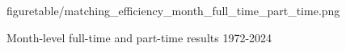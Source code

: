 \documentclass[12pt]{article}
\begin{document}
\begin{figure}[!ht]
\begin{center}
{  {figuretable/matching_efficiency_month_full_time_part_time.png}}
  \caption{Month-level full-time and part-time results 1972-2024}
  \label{fg:month_full_time_part_time_results} 
  \end{center}
  \footnotesize
\end{figure} 
\end{document}
